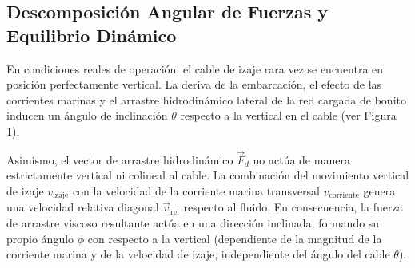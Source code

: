 \documentclass[11pt,a4paper]{article}
\begin{document}
\begin{figure}[H]
\end{figure}

\subsection{Descomposición Angular de Fuerzas y Equilibrio Dinámico}
En condiciones reales de operación, el cable de izaje rara vez se encuentra en posición perfectamente vertical. La deriva de la embarcación, el efecto de las corrientes marinas y el arrastre hidrodinámico lateral de la red cargada de bonito inducen un ángulo de inclinación $\theta$ respecto a la vertical en el cable (ver Figura 1).

Asimismo, el vector de arrastre hidrodinámico $\vec{F}_d$ no actúa de manera estrictamente vertical ni colineal al cable. La combinación del movimiento vertical de izaje $v_{\text{izaje}}$ con la velocidad de la corriente marina transversal $v_{\text{corriente}}$ genera una velocidad relativa diagonal $\vec{v}_{\text{rel}}$ respecto al fluido. En consecuencia, la fuerza de arrastre viscoso resultante actúa en una dirección inclinada, formando su propio ángulo $\phi$ con respecto a la vertical (dependiente de la magnitud de la corriente marina y de la velocidad de izaje, independiente del ángulo del cable $\theta$).
\end{document}
